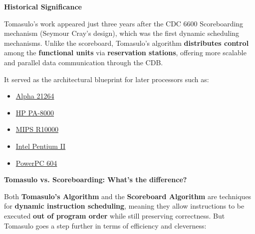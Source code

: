 \highspace
\begin{flushleft}
    \textcolor{Green3}{ \textbf{Historical Significance}}
\end{flushleft}
Tomasulo's work appeared just three years after the CDC 6600 Scoreboarding mechanism (Seymour Cray's design), which was the first dynamic scheduling mechanisms. Unlike the scoreboard, Tomasulo's algorithm \textbf{distributes control} among the \textbf{functional units} via \textbf{reservation stations}, offering more scalable and parallel data communication through the CDB.

\newpage

\noindent
It served as the architectural blueprint for later processors such as:
\begin{multicols}{2}
    \begin{itemize}
        \item \href{https://en.wikipedia.org/wiki/Alpha_21264}{Alpha 21264}
        \begin{center}
        \end{center}
        \item \href{https://en.wikipedia.org/wiki/PA-8000}{HP PA-8000}
        \begin{center}
        \end{center}
        \item \href{https://en.wikipedia.org/wiki/R10000}{MIPS R10000}
        \begin{center}
        \end{center}
        \item \href{https://en.wikipedia.org/wiki/Pentium_II}{Intel Pentium II}
        \begin{center}
        \end{center}
        \item \href{https://en.wikipedia.org/wiki/PowerPC_600#PowerPC_604}{PowerPC 604}
        \begin{center}
        \end{center}
    \end{itemize}
\end{multicols}

\highspace
\begin{flushleft}
    \textcolor{Green3}{ \textbf{Tomasulo vs. Scoreboarding: What's the difference?}}
\end{flushleft}
Both \textbf{Tomasulo's Algorithm} and the \textbf{Scoreboard Algorithm} are techniques for \textbf{dynamic instruction scheduling}, meaning they allow instructions to be executed \textbf{out of program order} while still preserving correctness. But Tomasulo goes a step further in terms of efficiency and cleverness:

